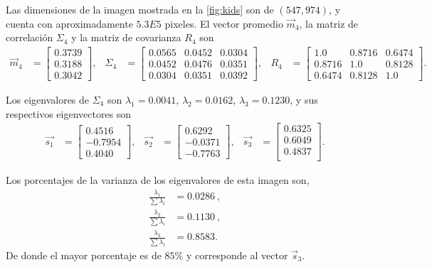 Las dimensiones de la imagen mostrada en la \cref{fig:kids} son de $(547, 974)$, y cuenta con aproximadamente $5.3E5$ pixeles. El vector promedio $\vec{m}_4$, la matriz de correlación $\Sigma_4$ y la matriz de covarianza $R_4$ son
\begin{align*}
    \vec{m}_4 & =
    \begin{bmatrix}
        0.3739 \\
        0.3188 \\
        0.3042
    \end{bmatrix}, &
    \Sigma_4 & =
    \begin{bmatrix}
        0.0565 & 0.0452 & 0.0304 \\
        0.0452 & 0.0476 & 0.0351 \\
        0.0304 & 0.0351 & 0.0392
    \end{bmatrix}, &
    R_4 & = 
    \begin{bmatrix}
        1.0    & 0.8716 & 0.6474 \\
        0.8716 & 1.0    & 0.8128 \\
        0.6474 & 0.8128 & 1.0
    \end{bmatrix}.
\end{align*}

Los eigenvalores de $\Sigma_4$ son $\lambda_1 = 0.0041$, $\lambda_2 = 0.0162$, $\lambda_3 = 0.1230$, y sus respectivos eigenvectores son
\begin{align*}
    \vec{s_1} & =
    \begin{bmatrix}
        0.4516 \\
        -0.7954 \\
         0.4040
    \end{bmatrix}, &
    \vec{s_2} & = 
    \begin{bmatrix}
        0.6292 \\
        -0.0371 \\
        -0.7763
    \end{bmatrix}, &
    \vec{s_3} & =
    \begin{bmatrix}
        0.6325 \\
        0.6049 \\
        0.4837 \\
    \end{bmatrix}.
\end{align*}

Los porcentajes de la varianza de los eigenvalores de esta imagen son,
\begin{align*}
    \frac{\lambda_1}{\sum \lambda_i} & = 0.0286\ , \\
    \frac{\lambda_2}{\sum \lambda_i} & = 0.1130\ , \\
    \frac{\lambda_3}{\sum \lambda_i} & = 0.8583 .
\end{align*}
De donde el mayor porcentaje es de $85\%$ y corresponde al vector $\vec{s}_3$.

